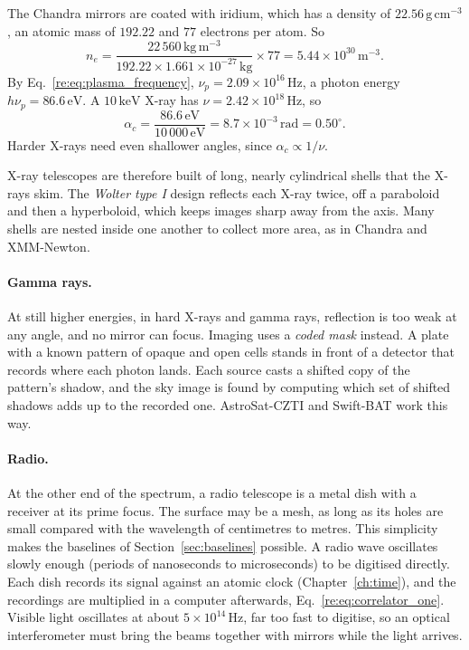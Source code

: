 \begin{example}
	The Chandra mirrors are coated with iridium, which has a density of $22.56\,\mathrm{g\,cm^{-3}}$, an atomic mass of $192.22$ and $77$ electrons per atom. So
	\[
	n_e=\frac{22\,560\,\mathrm{kg\,m^{-3}}}{192.22\times1.661\times10^{-27}\,\mathrm{kg}}\times77=5.44\times10^{30}\,\mathrm m^{-3}.
	\]
	By Eq.~\eqref{re:eq:plasma_frequency}, $\nu_p=2.09\times10^{16}\,\mathrm{Hz}$, a photon energy $h\nu_p=86.6\,\mathrm{eV}$. A $10\,\mathrm{keV}$ X-ray has $\nu=2.42\times10^{18}\,\mathrm{Hz}$, so
	\[
	\alpha_c=\frac{86.6\,\mathrm{eV}}{10\,000\,\mathrm{eV}}=8.7\times10^{-3}\,\mathrm{rad}=0.50^\circ .
	\]
	Harder X-rays need even shallower angles, since $\alpha_c\propto1/\nu$.
\end{example}
X-ray telescopes are therefore built of long, nearly cylindrical shells that the X-rays skim. The \emph{Wolter type I} design reflects each X-ray twice, off a paraboloid and then a hyperboloid, which keeps images sharp away from the axis. Many shells are nested inside one another to collect more area, as in Chandra and XMM-Newton.

\paragraph{Gamma rays.} At still higher energies, in hard X-rays and gamma rays, reflection is too weak at any angle, and no mirror can focus. Imaging uses a \emph{coded mask} instead. A plate with a known pattern of opaque and open cells stands in front of a detector that records where each photon lands. Each source casts a shifted copy of the pattern's shadow, and the sky image is found by computing which set of shifted shadows adds up to the recorded one. AstroSat-CZTI and Swift-BAT work this way.

\paragraph{Radio.} At the other end of the spectrum, a radio telescope is a metal dish with a receiver at its prime focus. The surface may be a mesh, as long as its holes are small compared with the wavelength of centimetres to metres. This simplicity makes the baselines of Section~\ref{sec:baselines} possible. A radio wave oscillates slowly enough (periods of nanoseconds to microseconds) to be digitised directly. Each dish records its signal against an atomic clock (Chapter~\ref{ch:time}), and the recordings are multiplied in a computer afterwards, Eq.~\eqref{re:eq:correlator_one}. Visible light oscillates at about $5\times10^{14}\,\mathrm{Hz}$, far too fast to digitise, so an optical interferometer must bring the beams together with mirrors while the light arrives.

